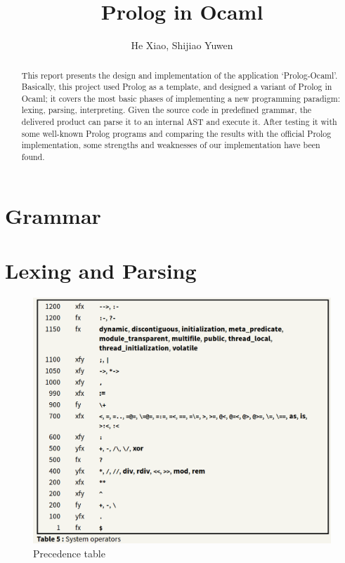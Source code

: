 \documentclass[11pt,a4paper]{report}
\author{He Xiao, Shijiao Yuwen}
\title{Prolog in Ocaml}
\begin{document}
	\maketitle
	
\begin{abstract}
	This report presents the design and implementation of the application `Prolog-Ocaml'.
	Basically, this project used Prolog \cite{PrologWiki} as a template, and designed a variant of Prolog in Ocaml;
	it covers the most basic phases of implementing a new programming paradigm: lexing, parsing, interpreting.
	Given the source code in predefined grammar, the delivered product can parse it to an internal AST and execute
	it. After testing it with some well-known Prolog programs and comparing the results with the official Prolog implementation,
	some strengths and weaknesses of our implementation have been found.  
\end{abstract}

\section*{Grammar}


\section*{Lexing and Parsing}


\begin{figure}
\centering
\includegraphics[width=0.9\linewidth]{precedenceTable}
\caption{Precedence table \cite{prologPrecedence}}
\label{fig:precedenceTable}
\end{figure}
\end{document}
